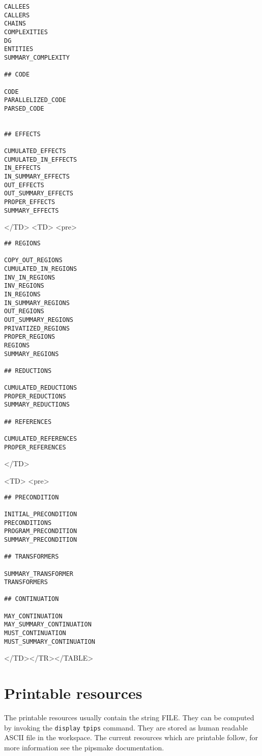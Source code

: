 \documentclass[a4paper,12pt]{article}
\begin{document}
{{\begin{verbatim}
CALLEES
CALLERS
CHAINS  
COMPLEXITIES  
DG      
ENTITIES 
SUMMARY_COMPLEXITY

## CODE 

CODE  
PARALLELIZED_CODE
PARSED_CODE


## EFFECTS

CUMULATED_EFFECTS
CUMULATED_IN_EFFECTS
IN_EFFECTS
IN_SUMMARY_EFFECTS
OUT_EFFECTS
OUT_SUMMARY_EFFECTS
PROPER_EFFECTS
SUMMARY_EFFECTS
\end{verbatim}}
\begin{rawhtml}
</TD>
<TD>
<pre>
\end{rawhtml}
{\bf \begin{verbatim}
## REGIONS
 
COPY_OUT_REGIONS                        
CUMULATED_IN_REGIONS                    
INV_IN_REGIONS                          
INV_REGIONS                             
IN_REGIONS
IN_SUMMARY_REGIONS
OUT_REGIONS
OUT_SUMMARY_REGIONS
PRIVATIZED_REGIONS
PROPER_REGIONS
REGIONS 
SUMMARY_REGIONS

## REDUCTIONS 

CUMULATED_REDUCTIONS                    
PROPER_REDUCTIONS
SUMMARY_REDUCTIONS

## REFERENCES

CUMULATED_REFERENCES                    
PROPER_REFERENCES
\end{verbatim}}
\begin{rawhtml}
</TD>

<TD>
<pre>
\end{rawhtml}
{\bf \begin{verbatim}
## PRECONDITION                   

INITIAL_PRECONDITION                    
PRECONDITIONS    
PROGRAM_PRECONDITION
SUMMARY_PRECONDITION

## TRANSFORMERS 

SUMMARY_TRANSFORMER
TRANSFORMERS 

## CONTINUATION 

MAY_CONTINUATION
MAY_SUMMARY_CONTINUATION
MUST_CONTINUATION
MUST_SUMMARY_CONTINUATION
\end{verbatim}
\begin{rawhtml}
</TD></TR></TABLE>
\end{rawhtml}

\section{Printable resources}
\label{resf}
The printable resources usually contain the string FILE. They can be
computed by invoking the \verb+display+ {\tt tpips} command. They are stored as
human readable ASCII file in the workspace. The current resources which
are printable follow, for more information see the pipsmake documentation.

}}
\end{document}

